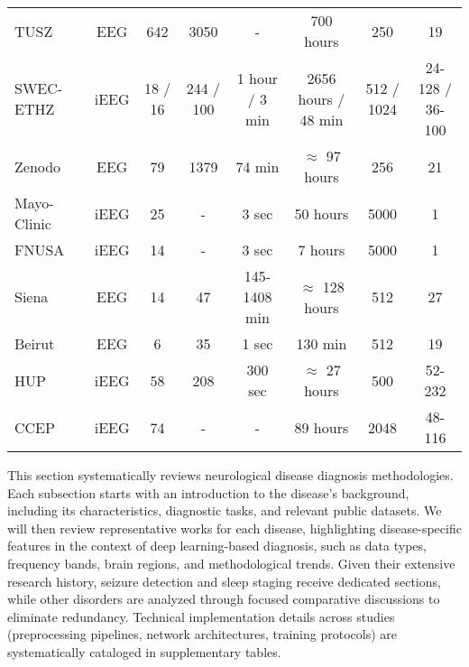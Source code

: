 \begin{table*}[t]
\begin{tabular}{lccccccc}
TUSZ~\cite{shah2018temple}             & EEG & {642}                                & {3050}               & {-}              & {700 hours}                         & {250}                      & {19}                \\
SWEC-ETHZ~\cite{burrello2018oneshot,burrello2019hdc} 
        & iEEG           & 18 / 16 & 244 / 100 & 1 hour / 3 min & 2656 hours / 48 min & 512 / 1024 & 24-128 / 36-100 \\
Zenodo~\cite{stevenson2019dataset}         & EEG & {79}                                 & {1379}                  & {74 min}           & {$\approx$ 97 hours}                    & {256}                      & {21}                \\
Mayo-Clinic~\cite{Nejedly2020}      & iEEG & {25}                                 & {-}           & {3 sec}      & {50 hours}                          & {5000}                     & {1}                 \\
FNUSA~\cite{Nejedly2020}           & iEEG & {14}                                 & {-}        & {3 sec}         & {7 hours}                           & {5000}                     & {1}                 \\
Siena~\cite{detti2020eeg}            & EEG & {14}                                 & {47}                  & {145-1408 min}             & {$\approx$ 128  hours}                         & {512}                      & {27}                \\
Beirut~\cite{nasreddine2021epileptic}           & EEG & {6}                                  & {35}        & {1 sec}                       & {130 min}                          & {512}                      & {19}                \\
HUP~\cite{HUP}              & iEEG & {58}                                 & {208}                       & {300 sec}       & {$\approx$ 27 hours}                    & {500}                      & {52-232}            \\
CCEP~\cite{ds004080:1.2.4} & iEEG & {74} & {-} & {-} & {89 hours} & {2048} & {48-116} \\  \hline
\end{tabular}
\end{table*}

This section systematically reviews neurological disease diagnosis methodologies. Each subsection starts with an introduction to the disease’s background, including its characteristics, diagnostic tasks, and relevant public datasets. We will then review representative works for each disease, highlighting disease-specific features in the context of deep learning-based diagnosis, such as data types, frequency bands, brain regions, and methodological trends. 
Given their extensive research history, seizure detection and sleep staging receive dedicated sections, while other disorders are analyzed through focused comparative discussions to eliminate redundancy. Technical implementation details across studies (preprocessing pipelines, network architectures, training protocols) are systematically cataloged in supplementary tables.

